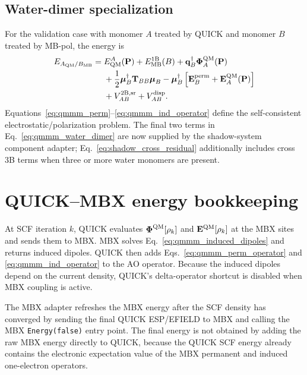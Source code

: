 \documentclass[11pt]{article}
\begin{document}
\subsection{Water-dimer specialization}

For the validation case with monomer $A$ treated by QUICK and monomer $B$
treated by MB-pol, the energy is
\begin{align}
  E_{A_{\rm QM}/B_{\rm MB}}
  ={}&
  E_{\rm QM}^{A}(\mathbf{P})
  + E_{\rm MB}^{1{\rm B}}(B)
  + \mathbf{q}_{B}^{\dagger}
    \boldsymbol{\Phi}_{A}^{\rm QM}(\mathbf{P})
  \nonumber\\
  &+
  \frac{1}{2}\boldsymbol{\mu}_{B}^{\dagger}
  \mathbf{T}_{BB}\boldsymbol{\mu}_{B}
  -
  \boldsymbol{\mu}_{B}^{\dagger}
  \left[
    \mathbf{E}_{B}^{\rm perm}
    + \mathbf{E}_{A}^{\rm QM}(\mathbf{P})
  \right]
  \nonumber\\
  &+
  V_{AB}^{2{\rm B},{\rm sr}}
  + V_{AB}^{\rm disp}.
  \label{eq:qmmm_water_dimer}
\end{align}
Equations~\ref{eq:qmmm_perm}--\ref{eq:qmmm_ind_operator} define the
self-consistent electrostatic/polarization problem. The final two terms in
Eq.~\ref{eq:qmmm_water_dimer} are now supplied by the shadow-system
component adapter; Eq.~\ref{eq:shadow_cross_residual} additionally includes
cross 3B terms when three or more water monomers are present.

\section{QUICK--MBX energy bookkeeping}

At SCF iteration $k$, QUICK evaluates
$\boldsymbol{\Phi}^{\rm QM}[\rho_k]$ and
$\mathbf{E}^{\rm QM}[\rho_k]$ at the MBX sites and sends them to MBX. MBX
solves Eq.~\ref{eq:qmmm_induced_dipoles} and returns induced dipoles. QUICK
then adds Eqs.~\ref{eq:qmmm_perm_operator} and
\ref{eq:qmmm_ind_operator} to the AO operator. Because the induced dipoles
depend on the current density, QUICK's delta-operator shortcut is disabled
when MBX coupling is active.

The MBX adapter refreshes the MBX energy after the SCF density has
converged by sending the final QUICK ESP/EFIELD to MBX and calling the MBX
\texttt{Energy(false)} entry point. The final energy is not obtained by
adding the raw MBX energy directly to QUICK, because the QUICK SCF energy
already contains the electronic expectation value of the MBX permanent and
induced one-electron operators.
\end{document}
